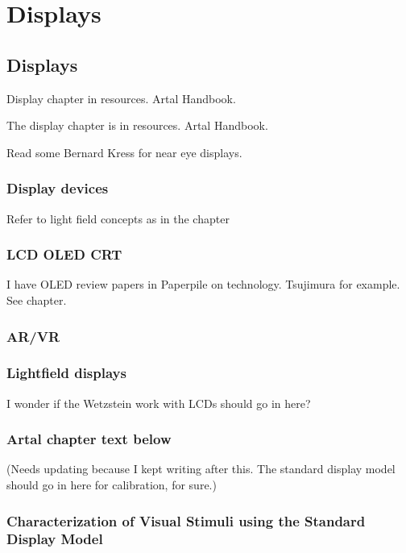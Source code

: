 \documentclass[
  letterpaper,
]{book}
\begin{document}
\part{Displays}

\chapter{Displays}\label{sec-displays}

Display chapter in resources. Artal Handbook.

The display chapter is in resources. Artal Handbook.

Read some Bernard Kress for near eye displays.

\section{Display devices}\label{display-devices}

Refer to light field concepts as in the chapter

\section{LCD OLED CRT}\label{lcd-oled-crt}

I have OLED review papers in Paperpile on technology. Tsujimura for
example. See chapter.

\section{AR/VR}\label{arvr}

\section{Lightfield displays}\label{lightfield-displays}

I wonder if the Wetzstein work with LCDs should go in here?

\section{Artal chapter text below}\label{artal-chapter-text-below}

(Needs updating because I kept writing after this. The standard display
model should go in here for calibration, for sure.)

\section{Characterization of Visual Stimuli using the Standard Display
Model}\label{characterization-of-visual-stimuli-using-the-standard-display-model}
\end{document}
